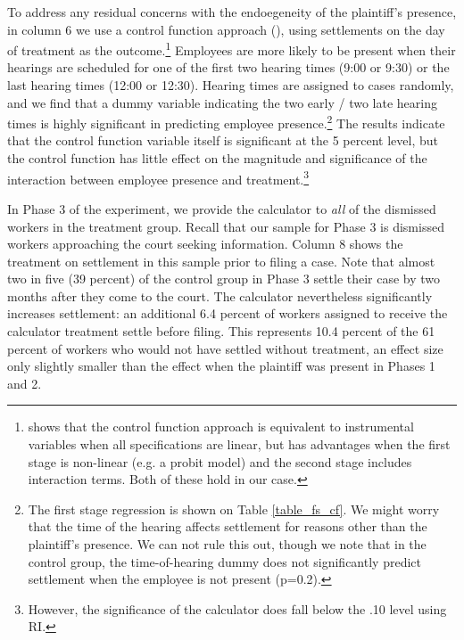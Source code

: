 \documentclass[11pt, a4paper]{article}
\begin{document}

To address any residual concerns with the endoegeneity of the plaintiff's presence, in column 6 we use a control function approach (\cite{Wooldridge2015}), using settlements on the day of treatment as the outcome.\footnote{\cite{Wooldridge2015} shows that the control function approach is equivalent to instrumental variables when all specifications are linear, but has advantages when the first stage is non-linear (e.g. a probit model) and the second stage includes interaction terms. Both of these hold in our case.} Employees are more likely to be present when their hearings are scheduled for one of the first two hearing times (9:00 or 9:30) or the last hearing times (12:00 or 12:30). Hearing times are assigned to cases randomly, and we find that a dummy variable indicating the two early / two late hearing times is highly significant in predicting employee presence.\footnote{The first stage regression is shown on Table \ref{table_fs_cf}. We might worry that the time of the hearing affects settlement for reasons other than the plaintiff's presence. We can not rule this out, though we note that in the control group, the time-of-hearing dummy does not significantly predict settlement when the employee is not present (p=0.2). } The results indicate that the control function variable itself is significant at the 5 percent level, but the control function has little effect on the magnitude and significance of the interaction between employee presence and treatment.\footnote{However, the significance of the calculator does fall below the .10 level using RI.}

In Phase 3 of the experiment, we provide the calculator to \textit{all} of the dismissed workers in the treatment group. Recall that our sample for Phase 3 is dismissed workers approaching the court seeking information. Column 8 shows the treatment on settlement in this sample prior to filing a case. Note that almost two in five (39 percent) of the control group in Phase 3 settle their case by two months after they come to the court. The calculator nevertheless significantly increases settlement: an additional 6.4 percent of workers assigned to receive the calculator treatment settle before filing. This represents 10.4 percent of the 61 percent of workers who would not have settled without treatment, an effect size only slightly smaller than the effect when the plaintiff was present in Phases 1 and 2. 
\end{document}
